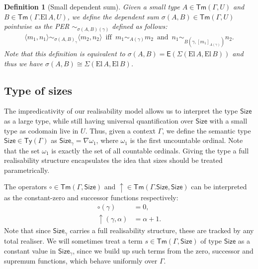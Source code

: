 \documentclass[10pt,a4paper]{article}
\newtheorem{definition}[theorem]{Definition}
\theoremstyle{definition}
\theoremstyle{remark}
\renewcommand{\.}{.\,} %
\renewcommand{\:}{:} %
\newcommand{\El}{\mathrm{El}\,}
\newcommand{\Size}{\mathsf{Size}}
\newcommand{\E}{\mathbb E}
\newcommand{\0}{\mathbf{0}}
\newcommand{\1}{\mathbf{1}}
\newcommand\<\langle
\renewcommand\>\rangle
\renewcommand{\E}{\mathsf{E}}
\newcommand{\Ty}{\mathsf{Ty}}
\newcommand{\Tm}{\mathsf{Tm}}
\newcommand{\U}{U}
\newcommand{\Iff}{\hspace{6pt}\text{iff}\hspace{6pt}}
\renewcommand{\and}{\hspace{6pt}\text{and}\hspace{6pt}}
\theoremstyle{remark}
\begin{document}
\begin{definition}[Small dependent sum]
	Given a small type $A \in \Tm(\Gamma, \U)$ and $B \in \Tm(\Gamma. \El A, \U)$, we define the dependent sum $\sigma (A, B) \in \Tm(\Gamma, \U)$ pointwise as the PER $\sim_{\sigma (A, B)(\gamma)}$ defined as follows:
	\begin{align*}
		\langle m_1, n_1 \rangle \sim_{\sigma(A, B)_\gamma} \langle m_2, n_2 \rangle \Iff m_1 \sim_{A(\gamma)} m_2 \and n_1 \sim_{B(\gamma, [m_1]_{A(\gamma)})} n_2.
	\end{align*}
	Note that this definition is equivalent to $\sigma(A, B) = \E(\Sigma (\El A, \El B))$ and thus we have $\sigma(A, B) \cong \Sigma(\El A, \El B)$. 
\end{definition}

\subsection{Type of sizes}
The impredicativity of our realisability model allows us to interpret the type $\Size$ as a large type, while still having universal quantification over $\Size$ with a small type as codomain live in $\U$.  
Thus, given a context $\Gamma$, we define the semantic type $\Size \in \Ty(\Gamma)$ as $\Size_\gamma = \nabla \omega_1$, where $\omega_1$ is the first uncountable ordinal. Note that the set $\omega_1$ is exactly the set of all countable ordinals. Giving the type a full realisability structure encapsulates the idea that sizes should be treated parametrically.

The operators $\circ \in \Tm(\Gamma, \Size)$ and ${\uparrow}  \in \Tm(\Gamma.\Size, \Size)$ can be interpreted as the constant-zero and successor functions respectively:
\begin{align*}
	\circ(\gamma) &= 0, \\
	\uparrow \!(\gamma, \alpha) &= \alpha + 1.
\end{align*}
Note that since $\Size_\gamma$ carries a full realisability structure, these are tracked by any total realiser. 
We will sometimes treat a term $s \in \Tm(\Gamma, \Size)$ of type $\Size$ as a constant value in $\Size_\gamma$, since we build up such terms from the zero, successor and supremum functions, which behave uniformly over $\Gamma$.
\end{document}
